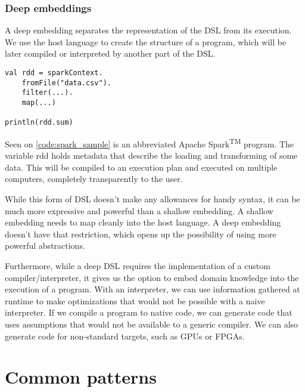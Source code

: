 \subsubsection{Deep embeddings}

A deep embedding separates the representation of the DSL from its execution. We use the host language to create the structure of a program, which will be later compiled or interpreted by another part of the DSL.

\begin{lstlisting}[caption=Sample spark code, label=code:spark_sample]
val rdd = sparkContext.
	fromFile("data.csv").
	filter(...).
	map(...)

println(rdd.sum)
\end{lstlisting}

Seen on \ref{code:spark_sample} is an abbreviated Apache Spark\textsuperscript{TM} program. The variable rdd holds metadata that describe the loading and transforming of some data. This will be compiled to an execution plan and executed on multiple computers, completely transparently to the user.

While this form of DSL doesn't make any allowances for handy syntax, it can be much more expressive and powerful than a shallow embedding. A shallow embedding needs to map cleanly into the host language. A deep embedding doesn't have that restriction, which opens up the possibility of using more powerful abstractions.

Furthermore, while a deep DSL requires the implementation of a custom compiler/interpreter, it gives us the option to embed domain knowledge into the execution of a program. With an interpreter, we can use information gathered at runtime to make optimizations that would not be possible with a naive interpreter. If we compile a program to native code, we can generate code that uses assumptions that would not be available to a generic compiler. We can also generate code for non-standard targets, such as GPUs or FPGAs.

\section{Common patterns}

